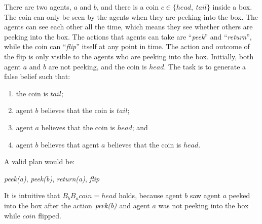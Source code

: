\begin{example}
\label{example:coin}
There are two agents, $a$ and $b$, and there is a coin $c \in \{head,\ tail\}$ inside a box. 
The coin can only be seen by the agents when they are peeking into the box.
The agents can see each other all the time, which means they see whether others are peeking into the box. 
The actions that agents can take are ``\emph{peek}'' and ``\emph{return}'', while the coin can ``\emph{flip}'' itself at any point in time. The action and outcome of the flip is only visible to the agents who are peeking into the box.
Initially, both agent $a$ and $b$ are not peeking, and the coin is $head$.
The task is to generate a false belief such that: 
\begin{enumerate}
    \item the coin is $tail$;
    \item agent $b$ believes that the coin is $tail$; 
    \item agent $a$ believes that the coin is $head$; and 
    \item agent $b$ believes that agent $a$ believes that the coin is $head$.
\end{enumerate}

\end{example}





A valid plan would be:
\begin{plan}
\label{plan1}
\emph{peek(a)}, \emph{peek(b)}, \emph{return(a)}, \emph{flip}
\end{plan}
It is intuitive that $B_b B_a coin=head$ holds, because agent $b$ saw agent $a$ peeked into the box after the action $\emph{peek(b)}$ and agent $a$ was not peeking into the box while $coin$ flipped.


